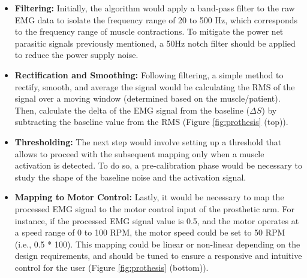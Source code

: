 \documentclass[conference]{IEEEtran}
\begin{document}
\begin{itemize}
   \item \textbf{Filtering:} Initially, the algorithm would apply a band-pass filter to the 
   raw EMG data to isolate the frequency range of 20 to 500 Hz, 
   which corresponds to the frequency range of muscle contractions. 
   To mitigate the power net parasitic signals previously mentioned, 
   a 50Hz notch filter should be applied to reduce the power supply noise.
   
   \item \textbf{Rectification and Smoothing:} Following filtering, 
   a simple method to rectify, smooth, and average the signal would be 
   calculating the RMS of the signal over a moving window (determined based on the muscle/patient).
   Then, calculate the delta of the EMG signal from the baseline (\( \Delta S \)) by subtracting the baseline value from the RMS (Figure \ref{fig:prothesis} (top)).
   
   \item \textbf{Thresholding:} The next step would involve setting up a threshold that allows to proceed with 
   the subsequent mapping only when a muscle activation is detected. To do so, a 
   pre-calibration phase would be necessary to study the shape of the baseline noise 
   and the activation signal.
   
   \item \textbf{Mapping to Motor Control:} Lastly, it would be necessary to map the processed 
   EMG signal to the motor control input of the prosthetic arm. 
   For instance, if the processed EMG signal value is 0.5, and the 
   motor operates at a speed range of 0 to 100 RPM, the motor 
   speed could be set to 50 RPM (i.e., 0.5 * 100). This mapping 
   could be linear or non-linear depending on the design 
   requirements, and should be tuned to ensure a responsive and 
   intuitive control for the user (Figure \ref{fig:prothesis} (bottom)).
\end{itemize}
\end{document}
